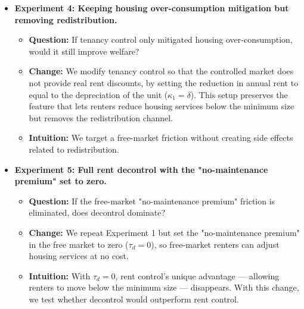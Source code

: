 \documentclass[parskip=full]{article}
\begin{document}
\begin{itemize}
  \item \textbf{Experiment 4: Keeping housing over-consumption mitigation but removing redistribution.}
  \begin{itemize}
      \item \textbf{Question:} If tenancy control only mitigated housing over-consumption, would it still improve welfare?
      \item \textbf{Change:} We modify tenancy control so that the controlled market does not provide real rent discounts, by setting the reduction in annual rent to equal to the depreciation of the unit ($\kappa_1=\delta$). This setup preserves the feature that lets renters reduce housing services below the minimum size but removes the redistribution channel.
      \item \textbf{Intuition:} We target a free-market friction without creating side effects related to redistribution.
  \end{itemize}

  \item \textbf{Experiment 5: Full rent decontrol with the "no-maintenance premium" set to zero.}
  \begin{itemize}
      \item \textbf{Question:} If the free-market "no-maintenance premium" friction is eliminated, does decontrol dominate?
      \item \textbf{Change:} We repeat Experiment 1 but set the "no-maintenance premium" in the free market to zero ($\tau_d=0$), so free-market renters can adjust housing services at no cost.
      \item \textbf{Intuition:} With $\tau_d=0$, rent control’s unique advantage — allowing renters to move below the minimum size — disappears. With this change, we test whether decontrol would outperform rent control.
  \end{itemize} 


\end{itemize}
\end{document}
